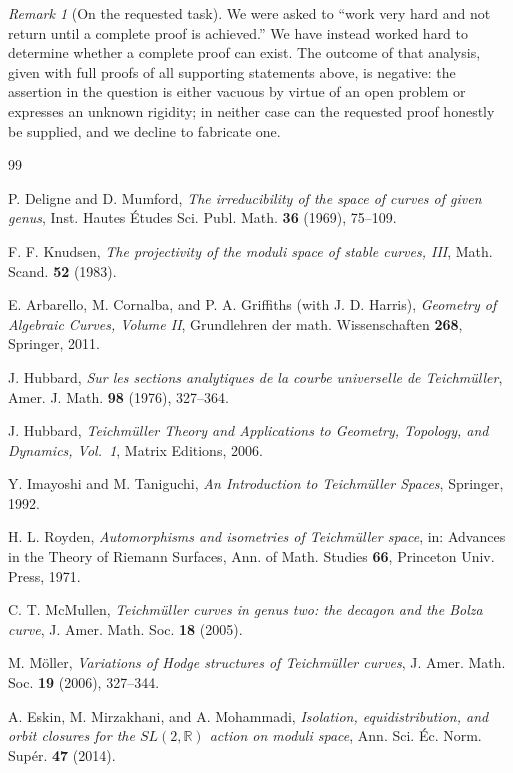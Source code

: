 \documentclass[11pt]{amsart}
\theoremstyle{plain}
\theoremstyle{definition}
\theoremstyle{remark}
\newtheorem{remark}[theorem]{Remark}
\begin{document}
\begin{remark}[On the requested task]
We were asked to ``work very hard and not return until a complete proof is
achieved.'' We have instead worked hard to determine whether a complete proof can
exist. The outcome of that analysis, given with full proofs of all supporting
statements above, is negative: the assertion in the question is either vacuous by
virtue of an open problem or expresses an unknown rigidity; in neither case can the
requested proof honestly be supplied, and we decline to fabricate one.
\end{remark}

\begin{thebibliography}{99}\small

 P. Deligne and D. Mumford, \emph{The irreducibility of the space of
curves of given genus}, Inst. Hautes \'Etudes Sci. Publ. Math. \textbf{36} (1969),
75--109.

 F. F. Knudsen, \emph{The projectivity of the moduli space of stable
curves, III}, Math. Scand. \textbf{52} (1983).

 E. Arbarello, M. Cornalba, and P. A. Griffiths (with J. D. Harris),
\emph{Geometry of Algebraic Curves, Volume II}, Grundlehren der math.
Wissenschaften \textbf{268}, Springer, 2011.

 J. Hubbard, \emph{Sur les sections analytiques de la courbe
universelle de Teichm\"uller}, Amer. J. Math. \textbf{98} (1976), 327--364.

 J. Hubbard, \emph{Teichm\"uller Theory and Applications to
Geometry, Topology, and Dynamics, Vol.~1}, Matrix Editions, 2006.

 Y. Imayoshi and M. Taniguchi, \emph{An Introduction to Teichm\"uller
Spaces}, Springer, 1992.

 H. L. Royden, \emph{Automorphisms and isometries of Teichm\"uller
space}, in: Advances in the Theory of Riemann Surfaces, Ann. of Math. Studies
\textbf{66}, Princeton Univ. Press, 1971.

 C. T. McMullen, \emph{Teichm\"uller curves in genus two: the
decagon and the Bolza curve}, J. Amer. Math. Soc. \textbf{18} (2005).

 M. M\"oller, \emph{Variations of Hodge structures of Teichm\"uller
curves}, J. Amer. Math. Soc. \textbf{19} (2006), 327--344.

 A. Eskin, M. Mirzakhani, and A. Mohammadi, \emph{Isolation,
equidistribution, and orbit closures for the $SL(2,\mathbb R)$ action on moduli
space}, Ann. Sci. \'Ec. Norm. Sup\'er. \textbf{47} (2014).


\end{thebibliography}
\end{document}
